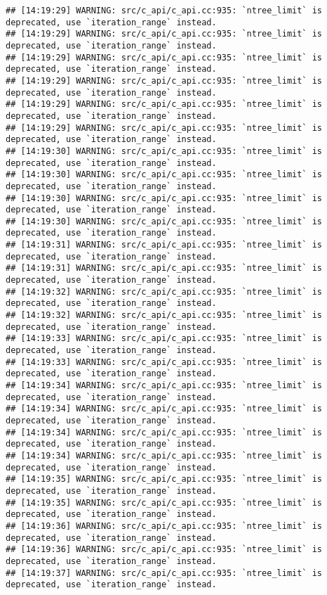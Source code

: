 \documentclass[
]{article}
\begin{document}
\begin{verbatim}
## [14:19:29] WARNING: src/c_api/c_api.cc:935: `ntree_limit` is deprecated, use `iteration_range` instead.
## [14:19:29] WARNING: src/c_api/c_api.cc:935: `ntree_limit` is deprecated, use `iteration_range` instead.
## [14:19:29] WARNING: src/c_api/c_api.cc:935: `ntree_limit` is deprecated, use `iteration_range` instead.
## [14:19:29] WARNING: src/c_api/c_api.cc:935: `ntree_limit` is deprecated, use `iteration_range` instead.
## [14:19:29] WARNING: src/c_api/c_api.cc:935: `ntree_limit` is deprecated, use `iteration_range` instead.
## [14:19:29] WARNING: src/c_api/c_api.cc:935: `ntree_limit` is deprecated, use `iteration_range` instead.
## [14:19:30] WARNING: src/c_api/c_api.cc:935: `ntree_limit` is deprecated, use `iteration_range` instead.
## [14:19:30] WARNING: src/c_api/c_api.cc:935: `ntree_limit` is deprecated, use `iteration_range` instead.
## [14:19:30] WARNING: src/c_api/c_api.cc:935: `ntree_limit` is deprecated, use `iteration_range` instead.
## [14:19:30] WARNING: src/c_api/c_api.cc:935: `ntree_limit` is deprecated, use `iteration_range` instead.
## [14:19:31] WARNING: src/c_api/c_api.cc:935: `ntree_limit` is deprecated, use `iteration_range` instead.
## [14:19:31] WARNING: src/c_api/c_api.cc:935: `ntree_limit` is deprecated, use `iteration_range` instead.
## [14:19:32] WARNING: src/c_api/c_api.cc:935: `ntree_limit` is deprecated, use `iteration_range` instead.
## [14:19:32] WARNING: src/c_api/c_api.cc:935: `ntree_limit` is deprecated, use `iteration_range` instead.
## [14:19:33] WARNING: src/c_api/c_api.cc:935: `ntree_limit` is deprecated, use `iteration_range` instead.
## [14:19:33] WARNING: src/c_api/c_api.cc:935: `ntree_limit` is deprecated, use `iteration_range` instead.
## [14:19:34] WARNING: src/c_api/c_api.cc:935: `ntree_limit` is deprecated, use `iteration_range` instead.
## [14:19:34] WARNING: src/c_api/c_api.cc:935: `ntree_limit` is deprecated, use `iteration_range` instead.
## [14:19:34] WARNING: src/c_api/c_api.cc:935: `ntree_limit` is deprecated, use `iteration_range` instead.
## [14:19:34] WARNING: src/c_api/c_api.cc:935: `ntree_limit` is deprecated, use `iteration_range` instead.
## [14:19:35] WARNING: src/c_api/c_api.cc:935: `ntree_limit` is deprecated, use `iteration_range` instead.
## [14:19:35] WARNING: src/c_api/c_api.cc:935: `ntree_limit` is deprecated, use `iteration_range` instead.
## [14:19:36] WARNING: src/c_api/c_api.cc:935: `ntree_limit` is deprecated, use `iteration_range` instead.
## [14:19:36] WARNING: src/c_api/c_api.cc:935: `ntree_limit` is deprecated, use `iteration_range` instead.
## [14:19:37] WARNING: src/c_api/c_api.cc:935: `ntree_limit` is deprecated, use `iteration_range` instead.

\end{verbatim}
\end{document}
